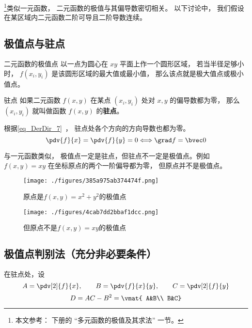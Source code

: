 

\footnote{本文参考： \cite{同济高} 下册的 “多元函数的极值及其求法” 一节。}类似一元函数， 二元函数的极值与其偏导数密切相关。 以下讨论中， 我们假设在某区域内二元函数二阶可导且二阶导数连续。

\subsection{极值点与驻点}
\begin{definition}{二元函数的极值点}
以一点为圆心在 $xy$ 平面上作一个圆形区域， 若当半径足够小时， $f(x_i, y_i)$ 是该圆形区域的最大值或最小值， 那么该点就是极大值点或极小值点。 
\end{definition}

\begin{definition}{驻点}
如果二元函数 $f(x,y)$ 在某点 $(x_i, y_i)$ 处对 $x, y$ 的偏导数都为零， 那么 $(x_i, y_i)$ 就叫做函数 $f(x,y)$ 的\textbf{驻点}。 
\end{definition}
根据\autoref{eq_DerDir_7}~， 驻点处各个方向的方向导数也都为零。
\begin{equation}
\pdv{f}{x}=\pdv{f}{y}=0 \Longleftrightarrow \grad f=\bvec0
\end{equation}

与一元函数类似， 极值点一定是驻点，但驻点不一定是极值点。例如 $f(x,y) = xy$ 在坐标原点的两个一阶偏导都为零， 但原点并不是极值点。 

\begin{figure}[ht]
\centering
\texttt{[image: ./figures/385a975ab374474f.png]}
\caption{原点是$f(x,y)=x^2+y^2$的极值点} \label{fig_F2Exm_1}
\end{figure}


\begin{figure}[ht]
\centering
\texttt{[image: ./figures/4cab7dd2bbaf1dcc.png]}
\caption{但原点不是$f(x,y)=xy$的极值点} \label{fig_F2Exm_2}
\end{figure}

\subsection{极值点判别法（充分非必要条件）}
在驻点处，设
\begin{equation}
A=\pdv[2]{f}{x},\qquad B=\pdv{f}{x}{y},\qquad C=\pdv[2]{f}{y}
\end{equation}
\begin{equation}
D=AC-B^2=
\vmat{
A&B\\
B&C}
\end{equation}

